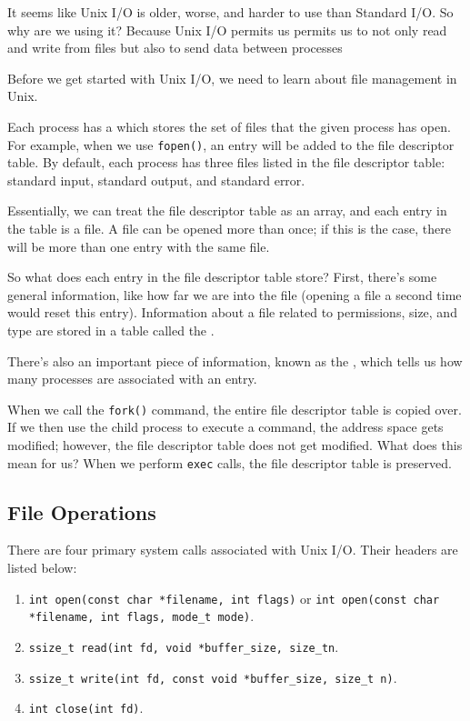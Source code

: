 It seems like Unix I/O is older, worse, and harder to use than Standard I/O. So why are we using it? Because Unix I/O permits us permits us to not only read and write from files but also to send data between processes

Before we get started with Unix I/O, we need to learn about file management in Unix.

Each process has a  which stores the set of files that the given process has open. For example, when we use \verb!fopen()!, an entry will be added to the file descriptor table. By default, each process has three files listed in the file descriptor table: standard input, standard output, and standard error. 

Essentially, we can treat the file descriptor table as an array, and each entry in the table is a file. A file can be opened more than once; if this is the case, there will be more than one entry with the same file.

So what does each entry in the file descriptor table store? First, there's some general information, like how far we are into the file (opening a file a second time would reset this entry). Information about a file related to permissions, size, and type are stored in a table called the . 


There's also an important piece of information, known as the , which tells us how many processes are associated with an entry.   


When we call the \verb!fork()! command, the entire file descriptor table is copied over. If we then use the child process to execute a command, the address space gets modified; however, the file descriptor table does not get modified. What does this mean for us? When we perform \verb!exec! calls, the file descriptor table is preserved. 


\subsection{File Operations}
There are four primary system calls associated with Unix I/O. Their headers are listed below: \begin{enumerate}
    \item \verb!int open(const char *filename, int flags)! or \verb!int open(const char *filename, int flags, mode_t mode)!.
    \item \verb!ssize_t read(int fd, void *buffer_size, size_tn!.
    \item \verb!ssize_t write(int fd, const void *buffer_size, size_t n)!. 
    \item \verb!int close(int fd)!.
\end{enumerate} 

